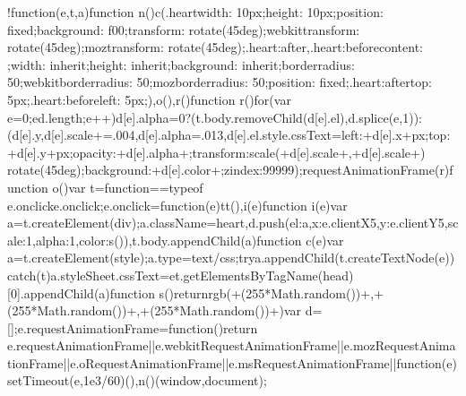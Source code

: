\documentclass[letterpaper,12pt,english]{sphinxmanual}
\begin{document}
\begin{sphinxVerbatim}[commandchars=\\\{\}]
!function(e,t,a)\PYGZob{}function n()\PYGZob{}c(\PYGZdq{}.heart\PYGZob{}width: 10px;height: 10px;position: fixed;background: \PYGZsh{}f00;transform: rotate(45deg);\PYGZhy{}webkit\PYGZhy{}transform: rotate(45deg);\PYGZhy{}moz\PYGZhy{}transform: rotate(45deg);\PYGZcb{}.heart:after,.heart:before\PYGZob{}content: \PYGZsq{}\PYGZsq{};width: inherit;height: inherit;background: inherit;border\PYGZhy{}radius: 50\PYGZpc{};\PYGZhy{}webkit\PYGZhy{}border\PYGZhy{}radius: 50\PYGZpc{};\PYGZhy{}moz\PYGZhy{}border\PYGZhy{}radius: 50\PYGZpc{};position: fixed;\PYGZcb{}.heart:after\PYGZob{}top: \PYGZhy{}5px;\PYGZcb{}.heart:before\PYGZob{}left: \PYGZhy{}5px;\PYGZcb{}\PYGZdq{}),o(),r()\PYGZcb{}function r()\PYGZob{}for(var e=0;e\PYGZlt{}d.length;e++)d[e].alpha\PYGZlt{}=0?(t.body.removeChild(d[e].el),d.splice(e,1)):(d[e].y\PYGZhy{}\PYGZhy{},d[e].scale+=.004,d[e].alpha\PYGZhy{}=.013,d[e].el.style.cssText=\PYGZdq{}left:\PYGZdq{}+d[e].x+\PYGZdq{}px;top:\PYGZdq{}+d[e].y+\PYGZdq{}px;opacity:\PYGZdq{}+d[e].alpha+\PYGZdq{};transform:scale(\PYGZdq{}+d[e].scale+\PYGZdq{},\PYGZdq{}+d[e].scale+\PYGZdq{}) rotate(45deg);background:\PYGZdq{}+d[e].color+\PYGZdq{};z\PYGZhy{}index:99999\PYGZdq{});requestAnimationFrame(r)\PYGZcb{}function o()\PYGZob{}var t=\PYGZdq{}function\PYGZdq{}==typeof e.onclick\PYGZam{}\PYGZam{}e.onclick;e.onclick=function(e)\PYGZob{}t\PYGZam{}\PYGZam{}t(),i(e)\PYGZcb{}\PYGZcb{}function i(e)\PYGZob{}var a=t.createElement(\PYGZdq{}div\PYGZdq{});a.className=\PYGZdq{}heart\PYGZdq{},d.push(\PYGZob{}el:a,x:e.clientX\PYGZhy{}5,y:e.clientY\PYGZhy{}5,scale:1,alpha:1,color:s()\PYGZcb{}),t.body.appendChild(a)\PYGZcb{}function c(e)\PYGZob{}var a=t.createElement(\PYGZdq{}style\PYGZdq{});a.type=\PYGZdq{}text/css\PYGZdq{};try\PYGZob{}a.appendChild(t.createTextNode(e))\PYGZcb{}catch(t)\PYGZob{}a.styleSheet.cssText=e\PYGZcb{}t.getElementsByTagName(\PYGZdq{}head\PYGZdq{})[0].appendChild(a)\PYGZcb{}function s()\PYGZob{}return\PYGZdq{}rgb(\PYGZdq{}+\PYGZti{}\PYGZti{}(255*Math.random())+\PYGZdq{},\PYGZdq{}+\PYGZti{}\PYGZti{}(255*Math.random())+\PYGZdq{},\PYGZdq{}+\PYGZti{}\PYGZti{}(255*Math.random())+\PYGZdq{})\PYGZdq{}\PYGZcb{}var d=[];e.requestAnimationFrame=function()\PYGZob{}return e.requestAnimationFrame||e.webkitRequestAnimationFrame||e.mozRequestAnimationFrame||e.oRequestAnimationFrame||e.msRequestAnimationFrame||function(e)\PYGZob{}setTimeout(e,1e3/60)\PYGZcb{}\PYGZcb{}(),n()\PYGZcb{}(window,document);
\end{sphinxVerbatim}
\end{document}
